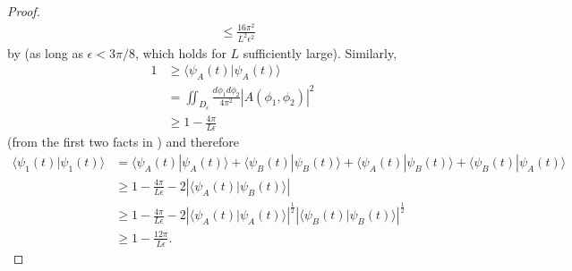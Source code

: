 \documentclass[../thesis-main/thesis-main]{subfiles}
\begin{document}
\begin{proof}
\begin{align*}
 & \leq \frac{16\pi^{2}}{L^{2}\epsilon^{2}}
\end{align*}
by  (as long as $\epsilon<{3\pi}/{8}$, which holds for $L$ sufficiently large).
Similarly, 
\begin{align*}
1 &\geq\langle\psi_{A}(t)|\psi_{A}(t)\rangle \\
&= \iint_{D_{\epsilon}}\frac{d\phi_{1}d\phi_{2}}{4\pi^{2}}\left|A(\phi_{1},\phi_{2})\right|^{2}\\
 & \geq 1-\frac{4\pi}{L\epsilon}
\end{align*}
(from the first two facts in ) and therefore
\begin{align*}
\langle\psi_{1}(t)|\psi_{1}(t)\rangle & = \langle\psi_{A}(t)|\psi_{A}(t)\rangle+\langle\psi_{B}(t)|\psi_{B}(t)\rangle+\langle\psi_{A}(t)|\psi_{B}(t)\rangle+\langle\psi_{B}(t)|\psi_{A}(t)\rangle\\
 & \geq 1-\frac{4\pi}{L\epsilon}-2\left|\langle\psi_{A}(t)|\psi_{B}(t)\rangle\right|\\
 & \geq 1-\frac{4\pi}{L\epsilon}-2\left|\langle\psi_{A}(t)|\psi_{A}(t)\rangle\right|^{\frac{1}{2}}\left|\langle\psi_{B}(t)|\psi_{B}(t)\rangle\right|^{\frac{1}{2}}\\
 & \geq 
 1-\frac{12\pi}{L\epsilon}.
\end{align*}


\end{proof}
\end{document}

